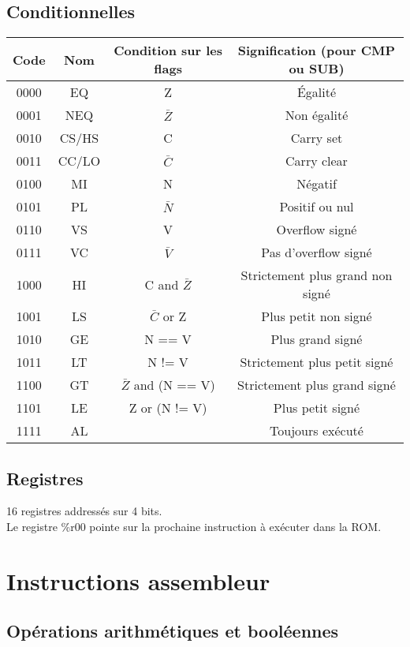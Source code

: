 \documentclass[a4paper]{article}
\begin{document}
  \subsection{Conditionnelles}
\begin{tabular}{|c|c|c|c|}
  \hline
  Code & Nom & Condition sur les flags & Signification (pour CMP ou SUB)\\
  \hline
  0000 & EQ & Z & Égalité\\
  0001 & NEQ & $\bar{Z}$ & Non égalité\\
  0010 & CS/HS & C & Carry set\\
  0011 & CC/LO & $\bar{C}$ & Carry clear\\
  0100 & MI & N & Négatif \\
  0101 & PL & $\bar{N}$ & Positif ou nul \\
  0110 & VS & V & Overflow signé \\
  0111 & VC & $\bar{V}$ & Pas d'overflow signé \\
  1000 & HI & C and $\bar{Z}$ & Strictement plus grand non signé \\
  1001 & LS & $\bar{C}$ or Z & Plus petit non signé \\
  1010 & GE & N == V & Plus grand signé \\
  1011 & LT & N != V & Strictement plus petit signé\\
  1100 & GT & $\bar{Z}$ and (N == V) & Strictement plus grand signé \\
  1101 & LE & Z or (N != V) & Plus petit signé \\
  1111 & AL &  & Toujours exécuté \\
  \hline
\end{tabular}

\subsection{Registres}
16 registres addressés sur 4 bits.\\
Le registre \%r00 pointe sur la prochaine instruction à exécuter dans la ROM.

\section{Instructions assembleur}

\subsection{Opérations arithmétiques et booléennes}
\end{document}
